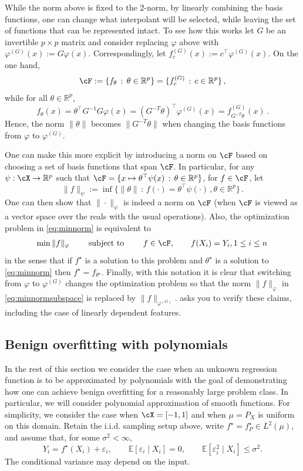 \documentclass[11pt,twoside]{article}
\newcommand{\E}{\mathbb E}
\newcommand{\R}{\mathbb R}
\theoremstyle{definition}
\theoremstyle{remark}
\begin{document}
While the norm above is fixed to the $2$-norm, 
by linearly combining the basis functions, one can change
what interpolant will be selected, while leaving the set
of functions that can be represented intact.
To see how this works let 
$G$ be an invertible $p\times p$ matrix and consider replacing $\varphi$ above with
$\varphi^{(G)}(x):=G\varphi(x)$. Correspondingly, let $f^{(G)}_c(x):= c^\top \varphi^{(G)}(x)$.
On the one hand, 
\[
\cF:=\{ f_\theta \,:\, \theta\in \R^p \} = \{ f^{(G)}_c\,:\, c\in \R^p \}\,,
\]
while for all $\theta\in \R^p$,
\[
f_\theta(x) = \theta^\top G^{-1} G \varphi(x) = (G^{-T}\theta)^\top \varphi^{(G)}(x) = f^{(G)}_{G^{-T}\theta}(x)\,.
\]
Hence, the norm $\|\theta\|$ becomes $\|G^{-T}\theta\|$ when changing
the basis functions from $\varphi$ to $\varphi^{(G)}$.

One can make this more explicit by introducing a norm on $\cF$ based on
choosing a set of basis functions that span $\cF$. In particular, for any 
$\psi: \cX \to \R^p$ such that $\cF = \{ x\mapsto \theta^\top \psi(x)\,:\, \theta\in \R^p \}$,
for $f\in \cF$, let 
\[
\|f\|_{\psi}:= \inf\{ \|\theta\| \,:\, f(\cdot) = \theta^\top \psi(\cdot)\,, \theta\in \R^p\}\,.
\]
One can then show that $\|\cdot\|_{\psi}$ is indeed a norm on $\cF$ (when $\cF$ is viewed as a vector space
over the reals with the usual operations).
Also, the optimization problem in \cref{eq:minnorm} is equivalent to 
\begin{align}
\min \|f\|_{\varphi} \qquad \text{ subject to } \qquad f\in \cF, \qquad
f(X_i)=Y_i,\quad 1\le i \le n\,
\label{eq:minnormsubspace}
\end{align}
in the sense that if $f^\star$ is a solution to this problem and $\theta^\star$ is a solution to
 \cref{eq:minnorm} then $f^\star = f_{\theta^\star}$.
Finally, with this notation it is clear that switching from $\varphi$ to $\varphi^{(G)}$
changes the optimization problem so that the norm
$\|f\|_{\varphi}$
in \cref{eq:minnormsubspace} is replaced
by 
$\|f\|_{\varphi^{(G)}}$.
 asks you to verify these claims, including
the case of linearly dependent features.

\subsection{Benign overfitting with polynomials}
In the rest of this section we consider the case when an unknown regression function
is to be approximated by polynomials with the goal of demonstrating 
how one can achieve benign overfitting for a reasonably large problem class.
In particular, we will consider polynomial approximation of smooth functions.
For simplicity, we consider the case when $\cX = [-1,1]$ and when $\mu = P_X$ is uniform on this domain.
Retain the i.i.d. sampling setup above, write $f^\star=f_P^\star\in L^2(\mu)$,
and assume that, for some $\sigma^2<\infty$,
\begin{equation}
 Y_i=f^\star(X_i)+\varepsilon_i,\qquad
 \E[\varepsilon_i\mid X_i]=0,\qquad
 \E[\varepsilon_i^2\mid X_i]\le\sigma^2.
 \label{eq:legendre-model}
\end{equation}
The conditional variance may depend on the input.
\end{document}
